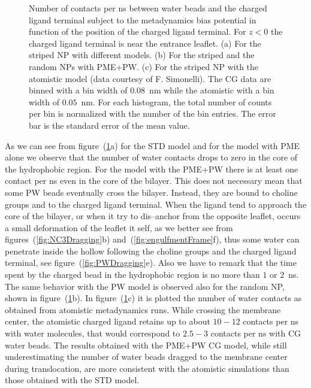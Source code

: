 \begin{figure}[ht!]
{	}%
	\caption{Number of contacts per ns between water beads and the charged ligand terminal subject to the metadynamics bias potential in function of the position of the charged ligand terminal. For $z<0$ the charged ligand terminal is near the entrance leaflet. (a) For the striped \acs{NP} with different models. (b) For the striped and the random \acs{NP}s with \acs{PME}+\acs{PW}. (c) For the striped \acs{NP} with the atomistic model (data courtesy of F. Simonelli). The \ac{CG} data are binned with a bin width of $0.08$~nm while the atomistic with a bin width of $0.05$~nm. For each histogram, the total number of counts per bin is normalized with the number of the bin entries. The error bar is the standard error of the mean value.}%
	\label{fig:WContact}
\end{figure}

As we can see from figure~(\ref{fig:WContact}a) for the \ac{STD} \martini model and for the model with \ac{PME} alone we observe that the number of water contacts drops to zero in the core of the hydrophobic region. For the model with the \ac{PME}+\ac{PW} there is at least one contact per ns even in the core of the bilayer. This does not necessary mean that some \ac{PW} beads eventually cross the bilayer. Instead, they are bound to choline groups and to the charged ligand terminal. When the ligand tend to approach the core of the bilayer, or when it try to dis--anchor from the opposite leaflet, occurs a small deformation of the leaflet it self, as we better see from figures~(\ref{fig:NC3Dragging}b) and~(\ref{fig:engulfmentFrame}f), thus some water can penetrate inside the hollow following the choline groups and the charged ligand terminal, see figure~(\ref{fig:PWDragging}e). Also we have to remark that the time spent by the charged bead in the hydrophobic region is no more than $1$ or $2$~ns. The same behavior with the \ac{PW} model is observed also for the random \ac{NP}, shown in figure~(\ref{fig:WContact}b). In figure~(\ref{fig:WContact}c) it is plotted the number of water contacts as obtained from atomistic metadynamics runs. While crossing the membrane center, the atomistic charged ligand retains up to about $10-12$ contacts per ns with water molecules, that would correspond to $2.5-3$ contacts per ns with \martini \ac{CG} water beads. The results obtained with the \ac{PME}$+$\ac{PW} \ac{CG} model, while still underestimating the number of water beads dragged to the membrane center during translocation, are more consistent with the atomistic simulations than those obtained with the \ac{STD} \martini model.

